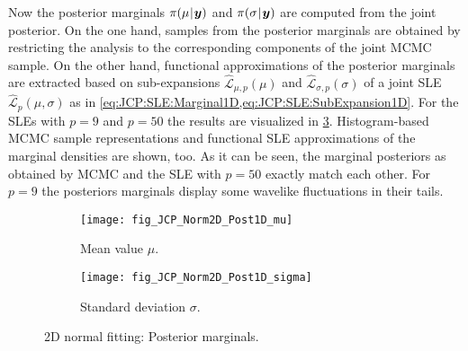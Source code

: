 \par %
Now the posterior marginals \(\pi(\mu {\:\!}|{\:\!} \bm{y})\) and \(\pi(\sigma {\:\!}|{\:\!} \bm{y})\) are computed from the joint posterior.
On the one hand, samples from the posterior marginals are obtained by restricting the analysis to the corresponding components of the joint MCMC sample.
On the other hand, functional approximations of the posterior marginals are extracted based on sub-expansions \(\hat{\mathcal{L}}_{\mu,p}(\mu)\)
and \(\hat{\mathcal{L}}_{\sigma,p}(\sigma)\) of a joint SLE \(\hat{\mathcal{L}}_p(\mu,\sigma)\) as in \cref{eq:JCP:SLE:Marginal1D,eq:JCP:SLE:SubExpansion1D}.
For the SLEs with \(p = 9\) and \(p = 50\) the results are visualized in \cref{fig:JCP:Normal:Post1D}.
Histogram-based MCMC sample representations and functional SLE approximations of the marginal densities are shown, too.
As it can be seen, the marginal posteriors as obtained by MCMC and the SLE with \(p = 50\) exactly match each other.
For \(p = 9\) the posteriors marginals display some wavelike fluctuations in their tails.
\begin{figure}[htbp]
  \centering
  \begin{subfigure}[b]{\JCPsubWidth}
    \centering
    \texttt{[image: fig\_JCP\_Norm2D\_Post1D\_mu]}
    \caption{Mean value \(\mu\).}
    \label{fig:JCP:Normal:Post1D:mu}
  \end{subfigure}\hfill%
  \begin{subfigure}[b]{\JCPsubWidth}
    \centering
    \texttt{[image: fig\_JCP\_Norm2D\_Post1D\_sigma]}
    \caption{Standard deviation \(\sigma\).}
    \label{fig:JCP:Normal:Post1D:sigma}
  \end{subfigure}%
  \caption[2D normal fitting: Posterior marginals]{2D normal fitting: Posterior marginals.}
  \label{fig:JCP:Normal:Post1D}
\end{figure}

